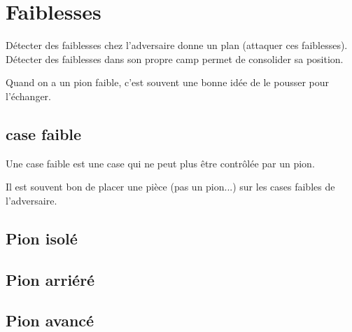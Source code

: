 
\section{Faiblesses}

Détecter des faiblesses chez l'adversaire donne un plan (attaquer ces faiblesses). Détecter des faiblesses dans son propre camp permet de consolider sa position.

Quand on a un pion faible, c'est souvent une bonne idée de le pousser pour l'échanger.

\subsection{case faible}

Une case faible est une case qui ne peut plus être contrôlée par un pion.

Il est souvent bon de placer une pièce (pas un pion...) sur les cases faibles de l'adversaire.

\subsection{Pion isolé}


\subsection{Pion arriéré}


\subsection{Pion avancé}

